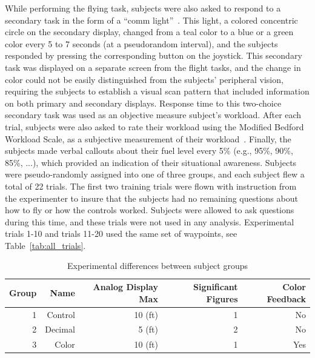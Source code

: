 \documentclass[]{aiaa-tc}%
\begin{document}
While performing the flying task, subjects were also asked to respond to a secondary task in the form of a ``comm light''~\cite{crosby1979dual, wickens1986sternberg, hainley2013pilot}. This light, a colored concentric circle on the secondary display, changed from a teal color to a blue or a green color every 5 to 7 seconds (at a pseudorandom interval), and the subjects responded by pressing the corresponding button on the joystick. This secondary task was displayed on a separate screen from the flight tasks, and the change in color could not be easily distinguished from the subjects' peripheral vision, requiring the subjects to establish a visual scan pattern that included information on both primary and secondary displays. Response time to this two-choice secondary task was used as an objective measure subject's workload. After each trial, subjects were also asked to rate their workload using the Modified Bedford Workload Scale, as a subjective measurement of their workload~\cite{wickens1991processing}. Finally, the subjects made verbal callouts about their fuel level every 5\% (e.g., 95\%, 90\%, 85\%, ...), which provided an indication of their situational awareness. Subjects were pseudo-randomly assigned into one of three groups, and each subject flew a total of 22 trials. The first two training trials were flown with instruction from the experimenter to insure that the subjects had no remaining questions about how to fly or how the controls worked. Subjects were allowed to ask questions during this time, and these trials were not used in any analysis. Experimental trials 1-10 and trials 11-20 used the same set of waypoints, see Table~\ref{tab:all_trials}.

\begin{table}[tb!]
  \centering
  \begin{tabular}{rrrrr}
    \toprule
    Group & Name    & Analog Display Max & Significant Figures & Color Feedback \\
    \midrule
    1     & Control & 10 (ft)            & 1                   & No             \\
    2     & Decimal & 5 (ft)             & 2                   & No             \\
    3     & Color   & 10 (ft)            & 1                   & Yes            \\
    \bottomrule
  \end{tabular}
  \caption{Experimental differences between subject groups}
  \label{tab:group_diffs}
\end{table}
\end{document}
